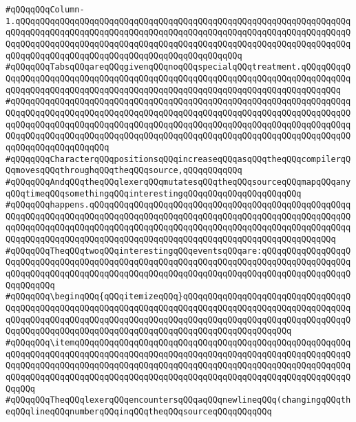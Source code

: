 \verb|#qQQqqQQqColumn-1.qQQqqQQqqQQqqQQqqQQqqQQqqQQqqQQqqQQqqQQqqQQqqQQqqQQqqQQqqQQqqQQqqQQqqQQqqQQqqQQqqQQqqQQqqQQqqQQqqQQqqQQqqQQqqQQqqQQqqQQqqQQqqQQqqQQqqQQqqQQqqQQqqQQqqQQqqQQqqQQqqQQqqQQqqQQqqQQqqQQqqQQqqQQqqQQqqQQqqQQqqQQqqQQqqQQqqQQqqQQqqQQqqQQqqQQqqQQqqQQqqQQqqQQqqQQqqQQq|\newline
\verb|#qQQqqQQqTabsqQQqareqQQqgivenqQQqnoqQQqspecialqQQqtreatment.qQQqqQQqqQQqqQQqqQQqqQQqqQQqqQQqqQQqqQQqqQQqqQQqqQQqqQQqqQQqqQQqqQQqqQQqqQQqqQQqqQQqqQQqqQQqqQQqqQQqqQQqqQQqqQQqqQQqqQQqqQQqqQQqqQQqqQQqqQQqqQQqqQQq|\newline
\verb|#qQQqqQQqqQQqqQQqqQQqqQQqqQQqqQQqqQQqqQQqqQQqqQQqqQQqqQQqqQQqqQQqqQQqqQQqqQQqqQQqqQQqqQQqqQQqqQQqqQQqqQQqqQQqqQQqqQQqqQQqqQQqqQQqqQQqqQQqqQQqqQQqqQQqqQQqqQQqqQQqqQQqqQQqqQQqqQQqqQQqqQQqqQQqqQQqqQQqqQQqqQQqqQQqqQQqqQQqqQQqqQQqqQQqqQQqqQQqqQQqqQQqqQQqqQQqqQQqqQQqqQQqqQQqqQQqqQQqqQQqqQQqqQQqqQQqqQQqqQQq|\newline
\verb|#qQQqqQQqCharacterqQQqpositionsqQQqincreaseqQQqasqQQqtheqQQqcompilerqQQqmovesqQQqthroughqQQqtheqQQqsource,qQQqqQQqqQQq|\newline
\verb|#qQQqqQQqAndqQQqtheqQQqlexerqQQqmutatesqQQqtheqQQqsourceqQQqmapqQQqanyqQQqtimeqQQqsomethingqQQqinterestingqQQqqQQqqQQqqQQqqQQqqQQq|\newline
\verb|#qQQqqQQqhappens.qQQqqQQqqQQqqQQqqQQqqQQqqQQqqQQqqQQqqQQqqQQqqQQqqQQqqQQqqQQqqQQqqQQqqQQqqQQqqQQqqQQqqQQqqQQqqQQqqQQqqQQqqQQqqQQqqQQqqQQqqQQqqQQqqQQqqQQqqQQqqQQqqQQqqQQqqQQqqQQqqQQqqQQqqQQqqQQqqQQqqQQqqQQqqQQqqQQqqQQqqQQqqQQqqQQqqQQqqQQqqQQqqQQqqQQqqQQqqQQqqQQqqQQqqQQqqQQqqQQq|\newline
\verb|#qQQqqQQqTheqQQqtwoqQQqinterestingqQQqeventsqQQqare:qQQqqQQqqQQqqQQqqQQqqQQqqQQqqQQqqQQqqQQqqQQqqQQqqQQqqQQqqQQqqQQqqQQqqQQqqQQqqQQqqQQqqQQqqQQqqQQqqQQqqQQqqQQqqQQqqQQqqQQqqQQqqQQqqQQqqQQqqQQqqQQqqQQqqQQqqQQqqQQqqQQqqQQq|\newline
\verb|#qQQqqQQq\beginqQQq{qQQqitemizeqQQq}qQQqqQQqqQQqqQQqqQQqqQQqqQQqqQQqqQQqqQQqqQQqqQQqqQQqqQQqqQQqqQQqqQQqqQQqqQQqqQQqqQQqqQQqqQQqqQQqqQQqqQQqqQQqqQQqqQQqqQQqqQQqqQQqqQQqqQQqqQQqqQQqqQQqqQQqqQQqqQQqqQQqqQQqqQQqqQQqqQQqqQQqqQQqqQQqqQQqqQQqqQQqqQQqqQQqqQQqqQQqqQQqqQQqqQQq|\newline
\verb|#qQQqqQQq\itemqQQqqQQqqQQqqQQqqQQqqQQqqQQqqQQqqQQqqQQqqQQqqQQqqQQqqQQqqQQqqQQqqQQqqQQqqQQqqQQqqQQqqQQqqQQqqQQqqQQqqQQqqQQqqQQqqQQqqQQqqQQqqQQqqQQqqQQqqQQqqQQqqQQqqQQqqQQqqQQqqQQqqQQqqQQqqQQqqQQqqQQqqQQqqQQqqQQqqQQqqQQqqQQqqQQqqQQqqQQqqQQqqQQqqQQqqQQqqQQqqQQqqQQqqQQqqQQqqQQqqQQqqQQqqQQq|\newline
\verb|#qQQqqQQqTheqQQqlexerqQQqencountersqQQqaqQQqnewlineqQQq(changingqQQqtheqQQqlineqQQqnumberqQQqinqQQqtheqQQqsourceqQQqqQQqqQQq|\newline
